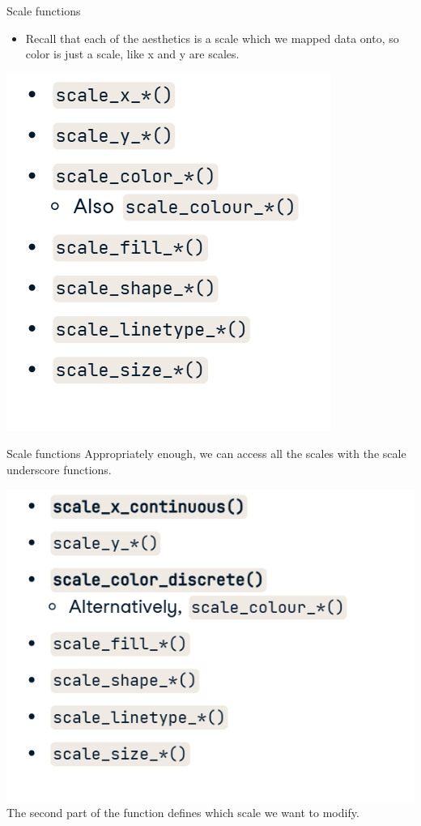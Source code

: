 \documentclass[
  ignorenonframetext,
]{beamer}
\providecommand{\tightlist}{%
  \setlength{\itemsep}{0pt}\setlength{\parskip}{0pt}}
\begin{document}
\begin{frame}{Scale functions}
\label{scale-functions}
\begin{itemize}
\tightlist
\item
  Recall that each of the aesthetics is a scale which we mapped data
  onto, so color is just a scale, like x and y are scales.
\end{itemize}

\includegraphics{../images/im158.png}
\end{frame}

\begin{frame}{Scale functions}
\label{scale-functions-1}
Appropriately enough, we can access all the scales with the scale
underscore functions.

\includegraphics{../images/im159.png}\\
The second part of the function defines which scale we want to modify.
\end{frame}
\end{document}

